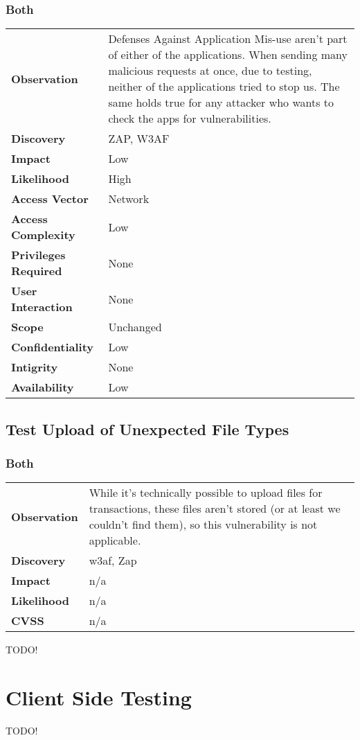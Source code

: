\subsubsection*{Both}
\begin{tabular}{l|p{10cm}}

\textbf{Observation} & Defenses Against Application Mis-use aren't part of either of the applications. When sending many malicious requests at once, due to testing, neither of the applications tried to stop us. The same holds true for any attacker who wants to check the apps for vulnerabilities. \\
\textbf{Discovery} & ZAP, W3AF \\
\textbf{Impact} & Low \\
\textbf{Likelihood} & High \\
\textbf{Access Vector} & Network \\
\textbf{Access Complexity} & Low \\
\textbf{Privileges Required} & None \\
\textbf{User Interaction} & None \\
\textbf{Scope} & Unchanged \\
\textbf{Confidentiality} & Low \\
\textbf{Intigrity} & None \\
\textbf{Availability} & Low \\
\end{tabular}

\clearpage


\subsection{Test Upload of Unexpected File Types}
\subsubsection*{Both}
\begin{tabular}{l|p{10cm}}

\textbf{Observation} & While it's technically possible to upload files for transactions, these files aren't stored (or at least we couldn't find them), so this vulnerability is not applicable. \\
\textbf{Discovery} & w3af, Zap \\
\textbf{Impact} & n/a \\
\textbf{Likelihood} & n/a \\
\textbf{CVSS} & n/a \\
\end{tabular}

\clearpage



TODO!











\section{Client Side Testing}
TODO!

